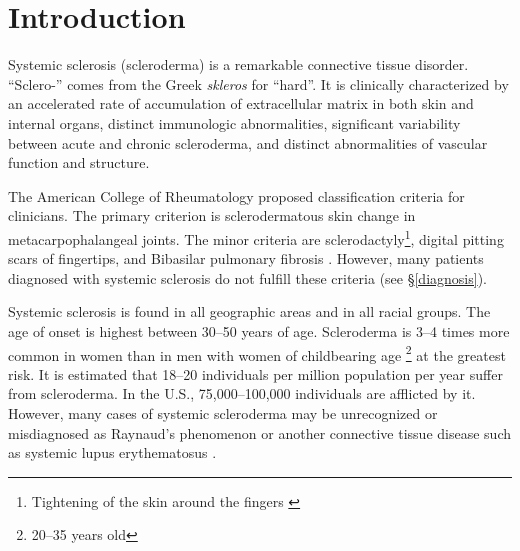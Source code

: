 \section{Introduction}

Systemic sclerosis (scleroderma) is a remarkable connective tissue disorder.
``Sclero-'' comes from the Greek \emph{skleros} for ``hard''. It is clinically
characterized by an accelerated rate of accumulation of extracellular matrix
in both skin and internal organs, distinct immunologic abnormalities,
significant variability between acute and chronic scleroderma, and distinct
abnormalities of vascular function and structure.

The American College of Rheumatology proposed \ssc classification criteria for
clinicians. The primary criterion is sclerodermatous skin change in
metacarpophalangeal joints. The minor criteria are sclerodactyly\footnote{
Tightening of the skin around the fingers \citep{dfnsclerodactyly}}, digital
pitting scars of fingertips, and Bibasilar pulmonary fibrosis
\citep[1211]{kelley}. However, many patients diagnosed with
systemic sclerosis do not fulfill these criteria (see \S\ref{diagnosis}).

Systemic sclerosis is found in all geographic areas and in all racial groups.
The age of onset is highest between 30--50 years of age. Scleroderma is 3--4
times more common in women than in men with women of childbearing age
\footnote{20--35 years old} at the greatest risk. It is
estimated that 18--20 individuals per million population per year suffer from
scleroderma. In the U.S., 75,000--100,000 individuals are afflicted by it.
However, many cases of systemic scleroderma may be unrecognized or
misdiagnosed as Raynaud's phenomenon or another connective tissue disease such
as systemic lupus erythematosus \citep[1212]{kelley}.

